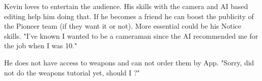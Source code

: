 \begin{npcBox}[title=Kevin\, Camera]
    \begin{consequences}
    \item {}
    \item {}
    \item {}
    \end{consequences}
    
    \begin{npcDescription}
    Kevin loves to entertain the audience. His skills with the camera and AI based editing help him doing that. If he becomes a friend he can boost the publicity of the Pioneer team (if they want it or not). More essential could be his Notice skills.
    "I've known I wanted to be a cameraman since the AI recommended me for the job when I was 10."


    He does not have access to weapons and can not order them by App. "Sorry, did not do the weapons tutorial yet, should I ?"

    \end{npcDescription}
    
\end{npcBox}


